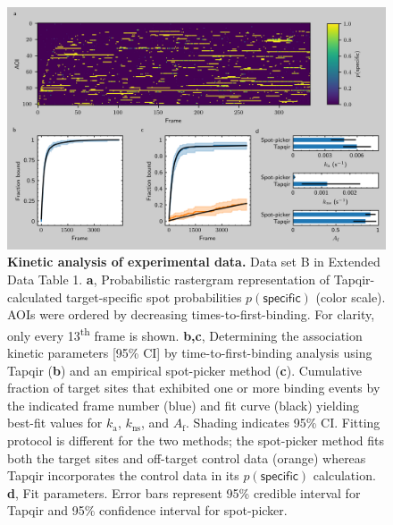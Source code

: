 \begin{figure}[h]
\centering
\includegraphics[width=\textwidth]{figures/figure7.png}
\caption{\textbf{Kinetic analysis of experimental data.} Data set B in Extended Data Table 1.  \textbf{a}, Probabilistic rastergram representation of Tapqir-calculated target-specific spot  probabilities $p(\mathsf{specific})$ (color scale). AOIs were ordered by decreasing times-to-first-binding. For clarity, only every 13\textsuperscript{th} frame is shown. \textbf{b,c}, Determining the association kinetic parameters [95\% CI] by  time-to-first-binding analysis using Tapqir (\textbf{b}) and an empirical spot-picker method \cite{Friedman2013-sf}(\textbf{c}).   Cumulative fraction of target sites that exhibited one or more binding events by the indicated frame number (blue) and fit curve (black) yielding best-fit values for $k_\mathrm{a}$, $k_\mathrm{ns}$, and $A_\mathrm{f}$. Shading indicates 95\% CI. Fitting protocol is different for the two methods; the spot-picker method fits both the target sites and off-target control data (orange) whereas Tapqir incorporates the control data in its $p(\mathsf{specific})$ calculation. \textbf{d}, Fit parameters. Error bars represent 95\% credible interval for Tapqir and 95\% confidence interval for spot-picker.
}
\label{fig:experimental_data}
\end{figure}
